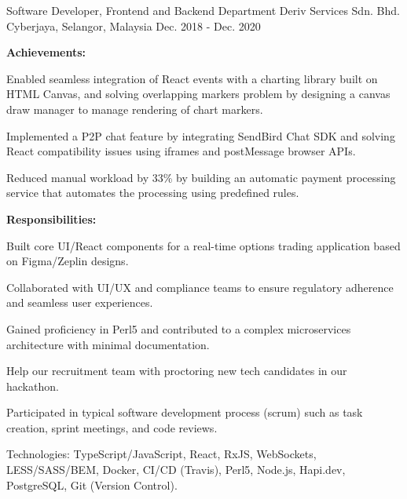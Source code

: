 \begin{cventries}
  \cventry
    {Software Developer, Frontend and Backend Department} %
    {Deriv Services Sdn. Bhd.} %
    {Cyberjaya, Selangor, Malaysia} %
    {Dec. 2018 - Dec. 2020} %
    {
      \textbf{Achievements:}
      \vspace{1.5em}
      \begin{cvitems} %
        \item {Enabled seamless integration of React events with a charting library built on HTML Canvas, and solving overlapping markers problem by designing a canvas draw manager to manage rendering of chart markers.}
        \item {Implemented a P2P chat feature by integrating SendBird Chat SDK and solving React compatibility issues using iframes and postMessage browser APIs.}
        \item {Reduced manual workload by 33\% by building an automatic payment processing service that automates the processing using predefined rules.}
      \end{cvitems}
      \vspace{1.5em}
      \textbf{Responsibilities:}
      \vspace{1.5em}
      \begin{cvitems} %
        \item {Built core UI/React components for a real-time options trading application based on Figma/Zeplin designs.}
        \item {Collaborated with UI/UX and compliance teams to ensure regulatory adherence and seamless user experiences.}
        \item {Gained proficiency in Perl5 and contributed to a complex microservices architecture with minimal documentation.}
        \item {Help our recruitment team with proctoring new tech candidates in our hackathon.}
        \item {Participated in typical software development process (scrum) such as task creation, sprint meetings, and code reviews.}
        \item {Technologies: TypeScript/JavaScript, React, RxJS, WebSockets, LESS/SASS/BEM, Docker, CI/CD (Travis), Perl5, Node.js, Hapi.dev, PostgreSQL, Git (Version Control).}
      \end{cvitems}
    }


\end{cventries}
